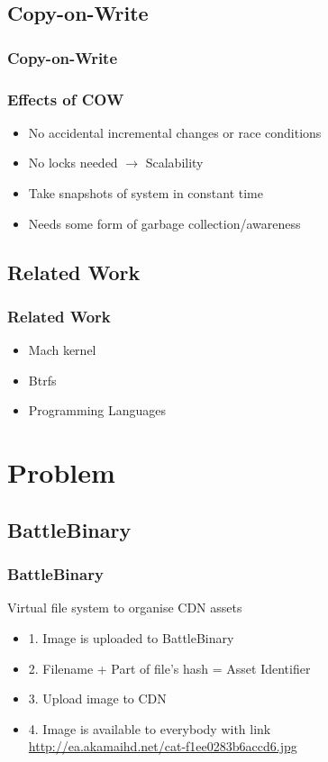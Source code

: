 \documentclass{beamer}
\begin{document}
\subsection{Copy-on-Write}
\begin{frame}
  \frametitle{Copy-on-Write}
  \centerline{}
\end{frame}

\begin{frame}
  \frametitle{Effects of COW}
  \begin{itemize}
    \item{No accidental incremental changes or race conditions}
    \pause
    \item{No locks needed $\rightarrow$ Scalability}
    \pause
    \item{Take snapshots of system in constant time}
    \pause
    \item{Needs some form of garbage collection/awareness}
   \end{itemize}
\end{frame}

\subsection{Related Work}
\begin{frame}
  \frametitle{Related Work}
  \begin{itemize}
    \item{Mach kernel}
    \pause
    \item{Btrfs}
    \pause
    \item{Programming Languages}
  \end{itemize}
\end{frame}


\section{Problem}

\subsection{BattleBinary}
\begin{frame}
  \frametitle{BattleBinary}
  Virtual file system to organise CDN assets
  \centerline{}
  \begin{itemize}
    \item{1. Image is uploaded to BattleBinary}
    \pause
    \item{2. Filename + Part of file's hash = Asset Identifier}
    \pause
    \item{3. Upload image to CDN}
    \pause
    \item{4. Image is available to everybody with
             link\\ \url{http://ea.akamaihd.net/cat-f1ee0283b6accd6.jpg}}
  \end{itemize}
\end{frame}
\end{document}
